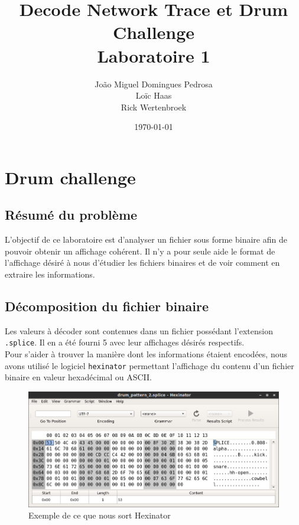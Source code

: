 \documentclass[10pt,a4paper]{article}
\author{João Miguel Domingues Pedrosa \\
Loïc Haas\\
Rick Wertenbroek}
\title{Decode Network Trace et Drum Challenge \\ Laboratoire 1}
\date{\today}
\begin{document}
\maketitle
\newpage
\tableofcontents
\newpage


\section{Drum challenge}

\subsection{Résumé du problème}

L'objectif de ce laboratoire est d'analyser un fichier sous forme binaire afin de pouvoir obtenir un affichage cohérent. Il n'y a pour seule aide le format de l'affichage désiré à nous d'étudier les fichiers binaires et de voir comment en extraire les informations.

\subsection{Décomposition du fichier binaire}

Les valeurs à décoder sont contenues dans un fichier possédant l'extension \texttt{.splice}. Il en a été fourni 5 avec leur affichages désirés respectifs.\\

Pour s'aider à trouver la manière dont les informations étaient encodées, nous avons utilisé le logiciel \texttt{hexinator} permettant l'affichage du contenu d'un fichier binaire en valeur hexadécimal ou ASCII.

\begin{figure}[ht]
	\includegraphics[scale=0.51]{images/hexa.png}
	\caption{Exemple de ce que nous sort Hexinator}
\end{figure}
\end{document}
